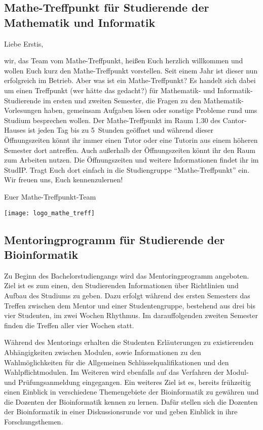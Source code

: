 \subsection[Mathe-Treffpunkt]{Mathe-Treffpunkt für Studierende der Mathematik und Informatik}

Liebe Erstis,

wir, das Team vom Mathe-Treffpunkt, heißen Euch herzlich willkommen und 
wollen Euch kurz den Mathe-Treffpunkt vorstellen. Seit einem Jahr ist 
dieser nun erfolgreich im Betrieb. Aber was ist ein Mathe-Treffpunkt? Es 
handelt sich dabei um einen Treffpunkt (wer hätte das gedacht?) für 
Mathematik- und Informatik- Studierende im ersten und zweiten Semester, 
die Fragen zu den Mathematik-Vorlesungen haben, gemeinsam Aufgaben lösen 
oder sonstige Probleme rund ums Studium besprechen wollen. Der 
Mathe-Treffpunkt im Raum 1.30 des Cantor-Hauses ist jeden Tag bis zu 5~Stunden geöffnet und während 
dieser Öffnungszeiten könnt ihr immer einen Tutor oder eine Tutorin aus 
einem höheren Semester dort antreffen. Auch außerhalb der Öffnungszeiten 
könnt ihr den Raum zum Arbeiten nutzen. Die Öffnungszeiten und weitere 
Informationen findet ihr im StudIP. Tragt Euch dort einfach in die 
Studiengruppe "`Mathe-Treffpunkt"' ein.
Wir freuen uns, Euch kennenzulernen!

Euer Mathe-Treffpunkt-Team

\begin{center}
    \texttt{[image: logo\_mathe\_treff]}%
\end{center}

\subsection[Mentoringprogramm]{Mentoringprogramm für Studierende der Bioinformatik}

Zu Beginn des Bachelorstudiengangs 
wird das Mentoringprogramm angeboten. 
Ziel ist es zum einen, den Studierenden 
Informationen über Richtlinien und Aufbau des Studiums zu geben. 
Dazu erfolgt während des ersten Semesters 
das Treffen zwischen dem Mentor und einer Studentengruppe,
bestehend aus drei bis vier Studenten, 
im zwei Wochen Rhythmus.
Im darauffolgenden zweiten Semester 
finden die Treffen aller vier Wochen statt.

Während des Mentorings erhalten die Studenten 
Erläuterungen zu existierenden Abhängigkeiten zwischen Modulen, 
sowie Informationen zu den Wahlmöglichkeiten 
für die Allgemeinen Schlüsselqualifikationen 
und den Wahlpflichtmodulen. 
Im Weiteren wird ebenfalls auf das Verfahren der
Modul- und Prüfungsanmeldung eingegangen. 
Ein weiteres Ziel ist es, bereits frühzeitig einen Einblick 
in verschiedene Themengebiete der Bioinformatik 
zu gewähren und die Dozenten der Bioinformatik kennen
zu lernen. 
Dafür stellen sich die Dozenten der Bioinformatik 
in einer Diskussionsrunde vor und geben
Einblick in ihre Forschungsthemen.

